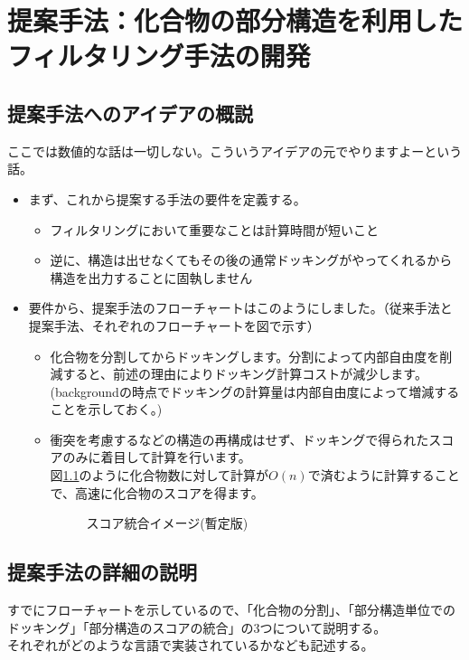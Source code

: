 \chapter{提案手法：化合物の部分構造を利用したフィルタリング手法の開発}

\section{提案手法へのアイデアの概説}
ここでは数値的な話は一切しない。こういうアイデアの元でやりますよーという話。
\begin{itemize}
\item まず、これから提案する手法の要件を定義する。
	\begin{itemize}
	\item フィルタリングにおいて重要なことは計算時間が短いこと
	\item 逆に、構造は出せなくてもその後の通常ドッキングがやってくれるから構造を出力することに固執しません
	\end{itemize}
\item 要件から、提案手法のフローチャートはこのようにしました。（従来手法と提案手法、それぞれのフローチャートを図で示す）
	\begin{itemize}
	\item 化合物を分割してからドッキングします。分割によって内部自由度を削減すると、前述の理由によりドッキング計算コストが減少します。\\
		(backgroundの時点でドッキングの計算量は内部自由度によって増減することを示しておく。)
	\item 衝突を考慮するなどの構造の再構成はせず、ドッキングで得られたスコアのみに着目して計算を行います。\\
		図\ref{fig:integration_image}のように化合物数に対して計算が$O(n)$で済むように計算することで、高速に化合物のスコアを得ます。
		\begin{figure}[htb]
		 \begin{center}
		  \caption{スコア統合イメージ(暫定版)}
		  \label{fig:integration_image}
		 \end{center}
		\end{figure}
	\end{itemize}
\end{itemize}

\section{提案手法の詳細の説明}
すでにフローチャートを示しているので、「化合物の分割」、「部分構造単位でのドッキング」「部分構造のスコアの統合」の3つについて説明する。\\
それぞれがどのような言語で実装されているかなども記述する。

